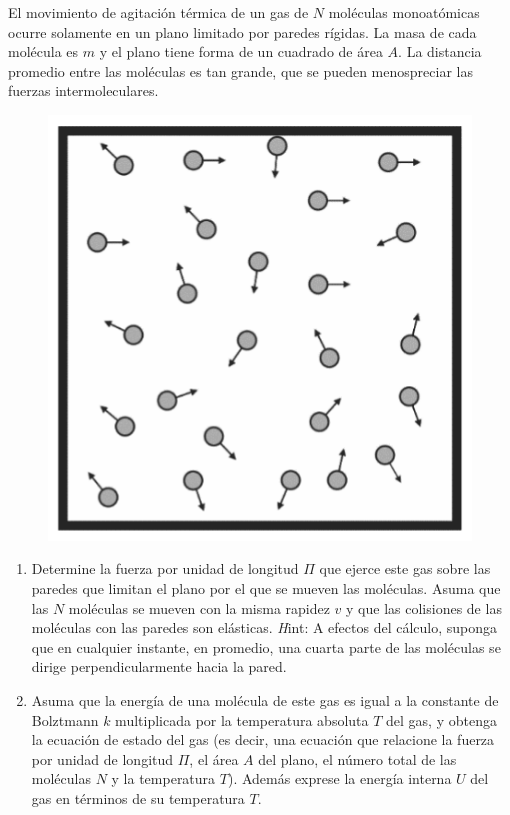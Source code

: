 \begin{mdframed}[style=warning]
	\begin{ejercicio}
		El movimiento de agitación térmica de un gas de $N$ moléculas monoatómicas ocurre solamente en un plano limitado por paredes rígidas. La masa de cada molécula es $m$ y el plano tiene forma de un cuadrado de área $A$. La distancia promedio entre las moléculas es tan grande, que se pueden menospreciar las fuerzas intermoleculares.
		\begin{figure}[H]
			\centering
			\includegraphics[scale=0.3]{./img/caja.png}
			\label{embolo}
		\end{figure}
		\begin{enumerate}
			\item Determine la fuerza por unidad de longitud $\Pi$ que ejerce este gas sobre las paredes que limitan el plano por el que se mueven las moléculas. Asuma que las $N$ moléculas se mueven con la misma rapidez $v$ y que las colisiones de las moléculas con las paredes son elásticas. {\textit Hint: A efectos del cálculo, suponga que en cualquier instante, en promedio, una cuarta parte de las moléculas se dirige perpendicularmente hacia la pared.}
			\item Asuma que la energía de una molécula de este gas es igual a la constante de Bolztmann $k$ multiplicada por la temperatura absoluta $T$ del gas, y obtenga la ecuación de estado del gas (es decir, una ecuación que relacione la fuerza por unidad de longitud $\Pi$, el área $A$ del plano, el número total de las moléculas $N$ y la temperatura $T$). Además exprese la energía interna $U$ del gas en términos de su temperatura $T$.
		\end{enumerate}
	\end{ejercicio}
\end{mdframed}












